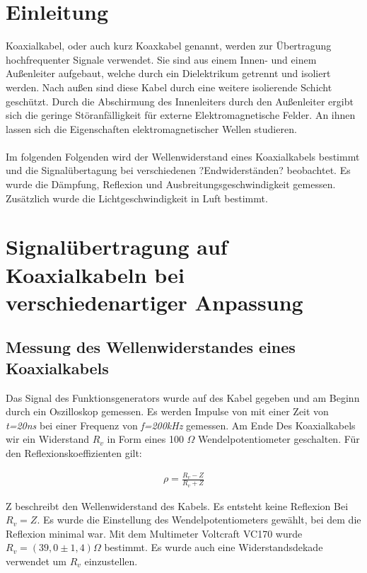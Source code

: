 \documentclass[a4paper,10pt,twocolumn]{scrartcl} %
\begin{document}
\section{Einleitung}

Koaxialkabel, oder auch kurz Koaxkabel genannt, werden zur Übertragung hochfrequenter Signale verwendet. Sie sind aus einem Innen- und einem Außenleiter aufgebaut, welche durch ein Dielektrikum getrennt und isoliert werden. Nach außen sind diese Kabel durch eine weitere isolierende Schicht geschützt. Durch die Abschirmung des Innenleiters durch den Außenleiter ergibt sich die geringe Störanfälligkeit für externe Elektromagnetische Felder. An ihnen lassen sich die Eigenschaften elektromagnetischer Wellen studieren.
\paragraph{} Im folgenden Folgenden wird der Wellenwiderstand eines Koaxialkabels bestimmt und die Signalübertagung bei verschiedenen ?Endwiderständen? beobachtet. Es wurde die Dämpfung, Reflexion und Ausbreitungsgeschwindigkeit gemessen. Zusätzlich wurde die Lichtgeschwindigkeit in Luft bestimmt.




\section{Signalübertragung auf Koaxialkabeln bei verschiedenartiger Anpassung}
\subsection{Messung des Wellenwiderstandes eines Koaxialkabels}
Das Signal des Funktionsgenerators wurde auf des Kabel gegeben und am Beginn durch ein Oszilloskop gemessen. Es werden Impulse von  mit einer Zeit von \textit{t=20ns} bei einer Frequenz von \textit{f=200kHz} gemessen. Am Ende Des Koaxialkabels wir ein Widerstand \textit{$R_v$} in Form eines 100 $\Omega$ Wendelpotentiometer geschalten. Für den Reflexionskoeffizienten gilt:

\begin{align}                         
\rho=\frac{R_v-Z}{R_v+Z}
\end{align}

Z beschreibt den Wellenwiderstand des Kabels. Es entsteht keine Reflexion Bei \textit{$R_v=Z$}. Es wurde die Einstellung des Wendelpotentiometers gewählt, bei dem die Reflexion minimal war. Mit dem Multimeter Voltcraft VC170 wurde \textit{$R_v = (39,0 \pm 1,4) \Omega$ } bestimmt. Es wurde auch eine Widerstandsdekade verwendet um \textit{$R_v$} einzustellen.
\end{document}

